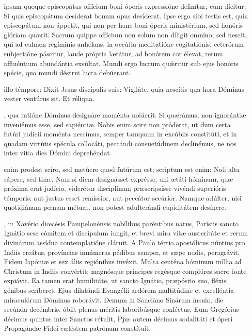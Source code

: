 \documentclass[fontsize=9pt,paper=A6,twoside,BCOR=1mm,DIV=22,headinclude]{scrarticle}
\begin{document}
\begin{multicols}{2}
{
 ipsum quoque episcopátus offícium boni óperis expressióne definítur, cum dícitur: Si quis episcopátum desíderat bonum opus desíderat. Ipse ergo sibi testis est, quia episcopátum non áppetit, qui non per hunc boni óperis ministérium, sed honóris glóriam quærit. Sacrum quippe offícium non solum non díligit omníno, sed nescit, qui ad culmen regíminis anhélans, in occúlta meditatióne cogitatiónis, ceterórum subjectióne páscitur, laude própria lætátur, ad honórem cor élevat, rerum affluéntium abundántia exsúltat. Mundi ergo lucrum qu\'æritur sub ejus honóris spécie, quo mundi déstrui lucra debúerant.

\RVCPvi

 illo témpore: Dixit Jesus discípulis suis: Vigiláte, quia nescítis qua hora Dóminus vester ventúrus sit. Et réliqua.

, qua ratióne Dóminus designáre moménta nolúerit. Si quærámus, non ignorántiæ inveniémus esse, sed sapiéntiæ. Nobis enim scire non próderat, ut dum certa futúri judícii moménta nescímus, semper tamquam in excúbiis constitúti, et in quadam virtútis spécula collocáti, peccándi consuetúdinem declinémus, ne nos inter vitia dies Dómini deprehéndat.


\RVCPvii 

 enim prodest sciro, sed metúere quod futúrum est; scriptum est enim: Noli alta sápere, sed time. Nam si diem designásset exprésse, uni ætáti hóminum, quæ próxima erat judício, viderétur disciplínam præscripsísse vivéndi superióris témporis; aut justus esset remíssior, aut peccátor secúrior. Namque adúlter, nisi quotidiánam pœnam métuat, non potest adulterándi cupiditátem desínere.

\RVCPviii 

, in Xavério diœcésis Pampelonénsis nobílibus paréntibus natus, Parísiis sancto Ignátio sese cómitem et discípulum iungit, et brevi mira vitæ austeritáte et rerum divinárum assídua contemplatióne cláruit. A Paulo tértio apostólicus núntius pro Indiis creátus, províncias innúmeras pédibus semper, et sæpe nudis, peragrávit. Fidem Iapóniæ et sex áliis regiónibus invéxit. Multa centéna hóminum míllia ad Christum in Indiis convértit; magnósque príncipes regésque complúres sacro fonte expiávit. Ea tamen erat humilitáte, ut sancto Ignátio, præpósito suo, fléxis génibus scríberet. Ejus dilatándi Evangélii ardórem multitúdine et excelléntia miraculórum Dóminus roborávit. Demum in Sanciáno Sinárum ínsula, die secúnda decémbris, óbiit plenus méritis laboribúsque conféctus. Eum Gregórius décimus quintus inter Sanctos rétulit, Pjus autem décimus sodalitáti et óperi Propagándæ Fídei cæléstem patrónum constítuit.

}
\end{multicols}
\end{document}
